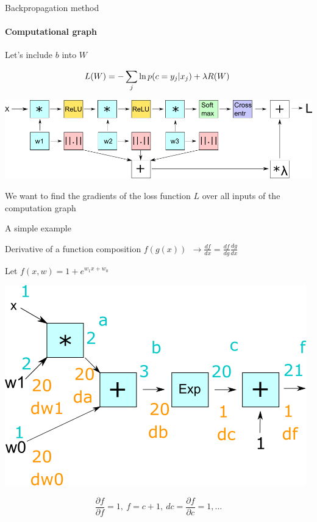 \documentclass[fullscreen=true, bookmarks=true, hyperref={pdfencoding=unicode}]{beamer}
\begin{document}
\begin{frame}{Backpropagation method}
  \framesubtitle{Computational graph}

  Let's include $b$ into $W$

  $$ L(W) = - \sum\limits_j \ln p(c = y_j|x_j) + \lambda R(W) \\ \ $$

      \begin{center}
        \includegraphics[keepaspectratio, width=0.8\paperwidth]{graph_calc.png}
      \end{center}

We want to find the gradients of the loss function $L$ over all inputs of the computation graph
\end{frame}


\begin{frame}{A simple example}

Derivative of a function composition $f(g(x))\ \ \to \frac{df}{dx} = \frac{df}{dg} \frac{dg}{dx}$

Let $f(x, w) = 1 + e^{w_1x + w_0}$

\begin{center}
  \includegraphics[keepaspectratio, width=0.5\paperwidth]{simple_graph.png}
\end{center}

$$ \frac{\partial f}{\partial f} = 1, \ f = c + 1, \ dc = \frac{\partial f}{\partial c} = 1, \dots$$    
\end{frame}
\end{document}
